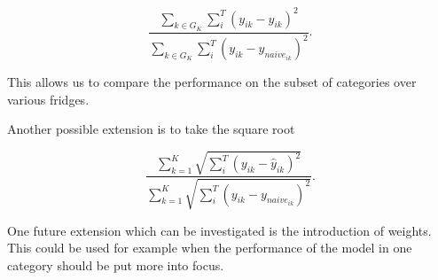\begin{equation}
\frac{\sum_{k \in G_K}\sum_{i}^T(y_{ik}-\hat{y}_{ik})^2}{\sum_{k \in G_K}\sum_{i}^T(y_{ik}-y_{naive_{ik}})^2}.
\label{eq: Error Measure Subsets}
\end{equation}

This allows us to compare the performance on the subset of categories over various fridges. 

Another possible extension is to take the square root

\begin{equation}
\frac{\sum_{k=1}^{K}\sqrt{\sum_{i}^T(y_{ik}-\hat{y}_{ik})^2}}{\sum_{k=1}^{K}\sqrt{\sum_{i}^T(y_{ik}-y_{naive_{ik}})^2}}.
\label{eq: Error Measure Sqrt} 
\end{equation}

One future extension which can be investigated is the introduction of weights. This could be used for example when the performance of the model in one category should be put more into focus. 